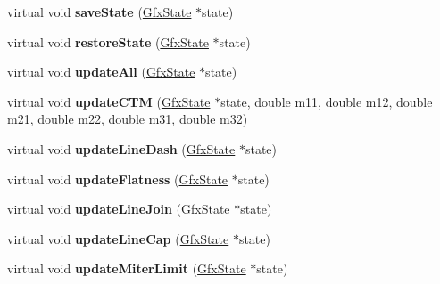 \begin{DoxyCompactItemize}
\mbox{\label{class_splash_output_dev_adbae408536813971115f49ffcc5bf9e4}} 
virtual void {\bfseries save\+State} (\hyperlink{class_gfx_state}{Gfx\+State} $\ast$state)
\item 
\mbox{\label{class_splash_output_dev_a984acc99cd5c00005839f92cea712d8f}} 
virtual void {\bfseries restore\+State} (\hyperlink{class_gfx_state}{Gfx\+State} $\ast$state)
\item 
\mbox{\label{class_splash_output_dev_a9a9a348a82d8f2c5e045c4fedd6efcde}} 
virtual void {\bfseries update\+All} (\hyperlink{class_gfx_state}{Gfx\+State} $\ast$state)
\item 
\mbox{\label{class_splash_output_dev_a26fb7faa226548082f477cf12bb8022f}} 
virtual void {\bfseries update\+C\+TM} (\hyperlink{class_gfx_state}{Gfx\+State} $\ast$state, double m11, double m12, double m21, double m22, double m31, double m32)
\item 
\mbox{\label{class_splash_output_dev_a4e68b7a79c9e0caf72d9eed6710c6970}} 
virtual void {\bfseries update\+Line\+Dash} (\hyperlink{class_gfx_state}{Gfx\+State} $\ast$state)
\item 
\mbox{\label{class_splash_output_dev_afbf1093b69f050356aa8fb87ff9e2a85}} 
virtual void {\bfseries update\+Flatness} (\hyperlink{class_gfx_state}{Gfx\+State} $\ast$state)
\item 
\mbox{\label{class_splash_output_dev_a8c558177fa28476830f4e4a3537ebb95}} 
virtual void {\bfseries update\+Line\+Join} (\hyperlink{class_gfx_state}{Gfx\+State} $\ast$state)
\item 
\mbox{\label{class_splash_output_dev_aae1617055a18bf202859878bc69bd215}} 
virtual void {\bfseries update\+Line\+Cap} (\hyperlink{class_gfx_state}{Gfx\+State} $\ast$state)
\item 
\mbox{\label{class_splash_output_dev_a72c2b36a7b11a0288a054a5627f1444a}} 
virtual void {\bfseries update\+Miter\+Limit} (\hyperlink{class_gfx_state}{Gfx\+State} $\ast$state)

\end{DoxyCompactItemize}

